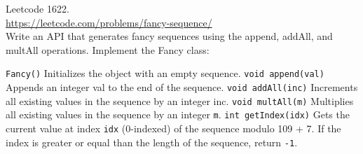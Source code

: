   Leetcode 1622.\\
  \url{https://leetcode.com/problems/fancy-sequence/}\\
  Write an API that generates fancy sequences using the append, addAll, and multAll operations.
  Implement the Fancy class:
  \begin{enumerate}[nosep]
    \li \verb!Fancy()! Initializes the object with an empty sequence.
    \li \verb!void append(val)! Appends an integer val to the end of the sequence.
    \li \verb!void addAll(inc)! Increments all existing values in the sequence by an integer inc.
    \li \verb!void multAll(m)! Multiplies all existing values in the sequence by an integer \verb!m!.
    \li \verb!int getIndex(idx)! Gets the current value at index \verb!idx! (0-indexed)
    of the sequence modulo 109 + 7.
    If the index is greater or equal than the length of the sequence, return \verb!-1!.
  \end{enumerate}
